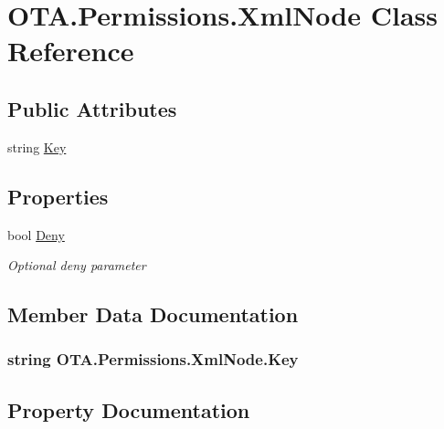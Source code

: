 \hypertarget{class_o_t_a_1_1_permissions_1_1_xml_node}{}\section{O\+T\+A.\+Permissions.\+Xml\+Node Class Reference}
\label{class_o_t_a_1_1_permissions_1_1_xml_node}
\subsection*{Public Attributes}
\begin{DoxyCompactItemize}
\item 
string \hyperlink{class_o_t_a_1_1_permissions_1_1_xml_node_a727e7ee71a23166f4fb888732b3d246e}{Key}
\end{DoxyCompactItemize}
\subsection*{Properties}
\begin{DoxyCompactItemize}
\item 
bool \hyperlink{class_o_t_a_1_1_permissions_1_1_xml_node_a16fdfe01ca86f0e60b599e6f986c4559}{Deny}
\begin{DoxyCompactList}\small\item\em Optional deny parameter \end{DoxyCompactList}\end{DoxyCompactItemize}


\subsection{Member Data Documentation}
\hypertarget{class_o_t_a_1_1_permissions_1_1_xml_node_a727e7ee71a23166f4fb888732b3d246e}{}
\subsubsection[{Key}]{\setlength{\rightskip}{0pt plus 5cm}string O\+T\+A.\+Permissions.\+Xml\+Node.\+Key}\label{class_o_t_a_1_1_permissions_1_1_xml_node_a727e7ee71a23166f4fb888732b3d246e}


\subsection{Property Documentation}
\hypertarget{class_o_t_a_1_1_permissions_1_1_xml_node_a16fdfe01ca86f0e60b599e6f986c4559}{}

